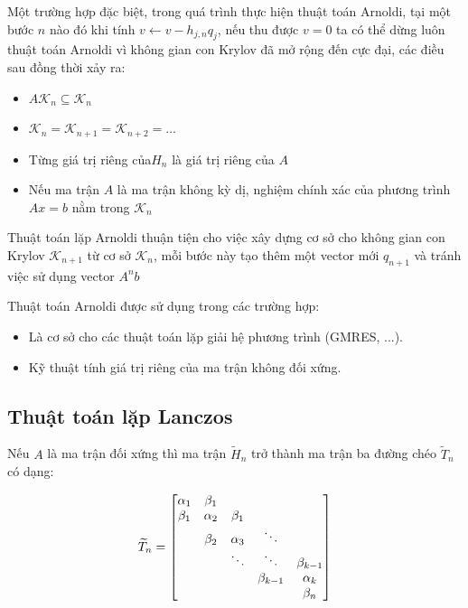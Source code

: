 \documentclass[14pt, a4paper]{article}
\numberwithin{equation}{section}
\numberwithin{algorithm}{section}
\numberwithin{figure}{section}
\numberwithin{dl}{section}
\numberwithin{md}{section}
\numberwithin{bd}{section}
\begin{document}
Một trường hợp đặc biệt, trong quá trình thực hiện thuật toán Arnoldi, tại một bước $n$ nào đó khi tính $v \leftarrow v - h_{j,n}q_j$, nếu thu được $v=0$ ta có thể dừng luôn thuật toán Arnoldi vì không gian con Krylov đã mở rộng đến cực đại, các điều sau đồng thời xảy ra:


\begin{itemize}
    \item $A\mathcal{K}_n \subseteq  \mathcal{K}_n$
    \item $\mathcal{K}_n=\mathcal{K}_{n+1}=\mathcal{K}_{n+2}=\dots$
    \item Từng giá trị riêng của$ H_n$ là giá trị riêng của $A$
    \item Nếu ma trận $A$ là ma trận không kỳ dị, nghiệm chính xác của phương trình $Ax=b$ nằm trong $\mathcal{K}_n$
\end{itemize}


Thuật toán lặp Arnoldi thuận tiện cho việc xây dựng cơ sở cho không gian con Krylov $\mathcal{K}_{n+1}$ từ cơ sở $\mathcal{K}_n$, mỗi bước này tạo thêm một vector mới $q_{n+1}$ và tránh việc sử dụng vector $A^n b$

Thuật toán Arnoldi được sử dụng trong các trường hợp:
\begin{itemize}
    \item Là cơ sở cho các thuật toán lặp giải hệ phương trình (GMRES, ...).
    \item Kỹ thuật tính giá trị riêng của ma trận không đối xứng.
\end{itemize}

\subsection{Thuật toán lặp Lanczos}


Nếu $A$ là ma trận đối xứng thì ma trận $\widetilde{H}_n$ trở thành ma trận ba đường chéo $\widetilde{T}_n$ có dạng:

\begin{equation} \label{eq:Trigonal_Matrix}
    \widetilde{T}_n = \begin{bmatrix}
        \alpha_1 & \beta_1 & \space & \space & \space \\
        \beta_1 & \alpha_2 & \beta_1 & \space & \space \\
        \space & \beta_2 & \alpha_3 & \ddots & \space \\
        \space & \space & \ddots & \ddots & \beta_{k-1} \\
        \space & \space & \space & \beta_{k-1} & \alpha_k \\
        \space & \space & \space & \space & \beta_{n}
    \end{bmatrix}
\end{equation}
\end{document}
